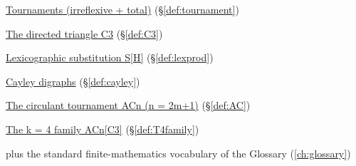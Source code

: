 \begin{closurepanel}
\item \hyperref[def:tournament]{Tournaments (irreflexive + total)} (\S\ref*{def:tournament})
\item \hyperref[def:C3]{The directed triangle C3} (\S\ref*{def:C3})
\item \hyperref[def:lexprod]{Lexicographic substitution S[H]} (\S\ref*{def:lexprod})
\item \hyperref[def:cayley]{Cayley digraphs} (\S\ref*{def:cayley})
\item \hyperref[def:AC]{The circulant tournament ACn (n = 2m+1)} (\S\ref*{def:AC})
\item \hyperref[def:T4family]{The k = 4 family ACn[C3]} (\S\ref*{def:T4family})
\item plus the standard finite-mathematics vocabulary of the Glossary (\cref{ch:glossary})
\end{closurepanel}
